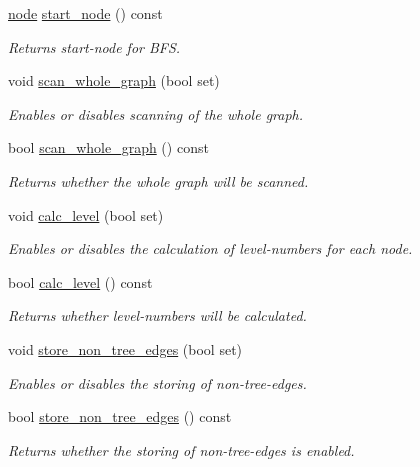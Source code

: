 \begin{DoxyCompactItemize}
\mbox{\hyperlink{classnode}{node}} \mbox{\hyperlink{classbfs_afac59b4a0d92449d8fa46a202b11ae4b}{start\+\_\+node}} () const
\begin{DoxyCompactList}\small\item\em Returns start-\/node for B\+FS. \end{DoxyCompactList}\item 
void \mbox{\hyperlink{classbfs_a25fc51b1bfbbdd3afefe0a84c1bd2f6b}{scan\+\_\+whole\+\_\+graph}} (bool set)
\begin{DoxyCompactList}\small\item\em Enables or disables scanning of the whole graph. \end{DoxyCompactList}\item 
bool \mbox{\hyperlink{classbfs_a1378f5cfbc59b036e9215c02563bac23}{scan\+\_\+whole\+\_\+graph}} () const
\begin{DoxyCompactList}\small\item\em Returns whether the whole graph will be scanned. \end{DoxyCompactList}\item 
void \mbox{\hyperlink{classbfs_a491515da4eb8efca0be4fef0df350a8e}{calc\+\_\+level}} (bool set)
\begin{DoxyCompactList}\small\item\em Enables or disables the calculation of level-\/numbers for each node. \end{DoxyCompactList}\item 
bool \mbox{\hyperlink{classbfs_a78ea23abb1461e62dd7ecd416fecbd96}{calc\+\_\+level}} () const
\begin{DoxyCompactList}\small\item\em Returns whether level-\/numbers will be calculated. \end{DoxyCompactList}\item 
void \mbox{\hyperlink{classbfs_a7de47b820fb9532f497660f767c9457f}{store\+\_\+non\+\_\+tree\+\_\+edges}} (bool set)
\begin{DoxyCompactList}\small\item\em Enables or disables the storing of non-\/tree-\/edges. \end{DoxyCompactList}\item 
bool \mbox{\hyperlink{classbfs_a9fe165e0a6d979d6d55b6234bfbe5b8f}{store\+\_\+non\+\_\+tree\+\_\+edges}} () const
\begin{DoxyCompactList}\small\item\em Returns whether the storing of non-\/tree-\/edges is enabled. \end{DoxyCompactList}\item 

\end{DoxyCompactItemize}
